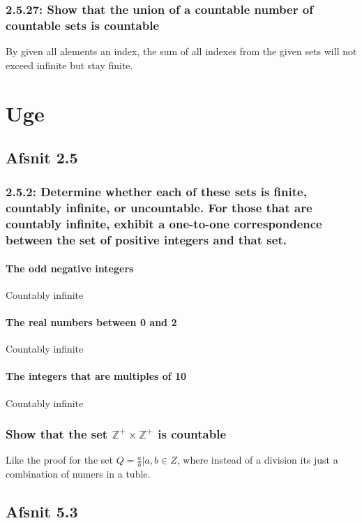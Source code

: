 \documentclass[12pt, a4paper]{report}
\begin{document}
				\subsection{2.5.27: Show that the union of a countable number of countable sets is countable}
					By given all alements an index, the sum of all indexes from the given sets will not exceed infinite but stay finite.
		\chapter{Uge}
			\section{Afsnit 2.5}
				\setcounter{subsection}{1}
				\subsection{2.5.2: Determine whether each of these sets is ﬁnite, countably inﬁnite, or uncountable. For those that are countably inﬁnite, exhibit a one-to-one correspondence between the set of positive integers and that set.}
					\setcounter{subsubsection}{1}
					\subsubsection{The odd negative integers}
						Countably infinite
					\setcounter{subsubsection}{3}
					\subsubsection{The real numbers between 0 and 2}
						Countably infinite
					\setcounter{subsubsection}{5}
					\subsubsection{The integers that are multiples of 10}
						Countably infinite
				\setcounter{subsection}{27}
				\subsection{Show that the set $\mathbb{Z}^+\times \mathbb{Z}^+$ is countable}
					Like the proof for the set $Q=\frac{a}{b}|a,b \in Z$, where instead of a division its just a combination of numers in a tuble. \\
			\section{Afsnit 5.3}
				\setcounter{subsection}{0}
\end{document}
